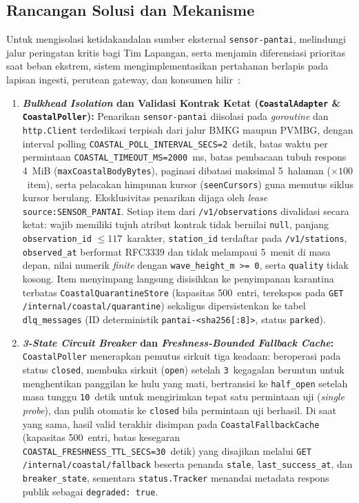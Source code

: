 \subsection{Rancangan Solusi dan Mekanisme}
Untuk mengisolasi ketidakandalan sumber eksternal \texttt{sensor-pantai}, melindungi jalur peringatan kritis bagi Tim Lapangan, serta menjamin diferensiasi prioritas saat beban ekstrem, sistem mengimplementasikan pertahanan berlapis pada lapisan ingesti, perutean gateway, dan konsumen hilir~\cite{nygard2018release,beyer2016sre,newman2021building,richardson2018microservices,kleppmann2017designing}:

\begin{enumerate}
    \item \textbf{\textit{Bulkhead Isolation} dan Validasi Kontrak Ketat (\texttt{CoastalAdapter} \& \texttt{CoastalPoller}):} Penarikan \texttt{sensor-pantai} diisolasi pada \textit{goroutine} dan \texttt{http.Client} terdedikasi terpisah dari jalur BMKG maupun PVMBG, dengan interval polling \texttt{COASTAL\_POLL\_INTERVAL\_SECS=2}~detik, batas waktu per permintaan \texttt{COASTAL\_TIMEOUT\_MS=2000}~ms, batas pembacaan tubuh respons 4~MiB (\texttt{maxCoastalBodyBytes}), paginasi dibatasi maksimal 5~halaman ($\times 100$~item), serta pelacakan himpunan kursor (\texttt{seenCursors}) guna memutus siklus kursor berulang. Eksklusivitas penarikan dijaga oleh \textit{lease} \texttt{source:SENSOR\_PANTAI}. Setiap item dari \texttt{/v1/observations} divalidasi secara ketat: wajib memiliki tujuh atribut kontrak tidak bernilai \texttt{null}, panjang \texttt{observation\_id} $\le 117$~karakter, \texttt{station\_id} terdaftar pada \texttt{/v1/stations}, \texttt{observed\_at} berformat RFC3339 dan tidak melampaui 5~menit di masa depan, nilai numerik \textit{finite} dengan \texttt{wave\_height\_m >= 0}, serta \texttt{quality} tidak kosong. Item menyimpang langsung disisihkan ke penyimpanan karantina terbatas \texttt{CoastalQuarantineStore} (kapasitas 500~entri, terekspos pada \texttt{GET /internal/coastal/quarantine}) sekaligus dipersistenkan ke tabel \texttt{dlq\_messages} (ID deterministik \texttt{pantai-<sha256[:8]>}, status \texttt{parked}).
    \item \textbf{\textit{3-State Circuit Breaker} dan \textit{Freshness-Bounded Fallback Cache}:} \texttt{CoastalPoller} menerapkan pemutus sirkuit tiga keadaan: beroperasi pada status \texttt{closed}, membuka sirkuit (\texttt{open}) setelah \texttt{3}~kegagalan beruntun untuk menghentikan panggilan ke hulu yang mati, bertransisi ke \texttt{half\_open} setelah masa tunggu \texttt{10}~detik untuk mengirimkan tepat satu permintaan uji (\textit{single probe}), dan pulih otomatis ke \texttt{closed} bila permintaan uji berhasil. Di saat yang sama, hasil valid terakhir disimpan pada \texttt{CoastalFallbackCache} (kapasitas 500~entri, batas kesegaran \texttt{COASTAL\_}\allowbreak\texttt{FRESHNESS\_TTL\_SECS=30}~detik) yang disajikan melalui \texttt{GET /internal/coastal/fallback} beserta penanda \texttt{stale}, \texttt{last\_success\_at}, dan \texttt{breaker\_state}, sementara \texttt{status.Tracker} menandai metadata respons publik sebagai \texttt{degraded: true}.

\end{enumerate}
